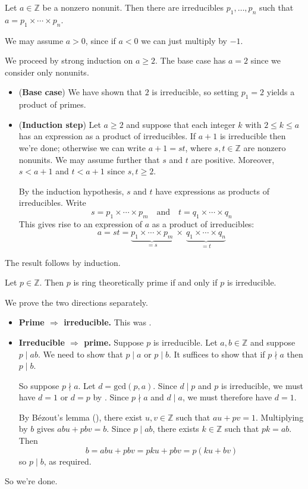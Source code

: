 \begin{lemma}
\label{lemFTAExists}
Let $a \in \mathbb{Z}$ be a nonzero nonunit. Then there are irreducibles $p_1, \dots, p_n$ such that $a = p_1 \times \cdots \times p_n$.
\end{lemma}
\begin{cproof}
We may assume $a>0$, since if $a<0$ we can just multiply by $-1$.

We proceed by strong induction on $a \ge 2$. The base case has $a=2$ since we consider only nonunits.
\begin{itemize}
\item (\textbf{Base case}) We have shown that $2$ is irreducible, so setting $p_1=2$ yields a product of primes.
\item (\textbf{Induction step}) Let $a \ge 2$ and suppose that each integer $k$ with $2 \le k \le a$ has an expression as a product of irreducibles. If $a+1$ is irreducible then we're done; otherwise we can write $a+1=st$, where $s,t \in \mathbb{Z}$ are nonzero nonunits. We may assume further that $s$ and $t$ are positive. Moreover, $s<a+1$ and $t<a+1$ since $s,t \ge 2$.

By the induction hypothesis, $s$ and $t$ have expressions as products of irreducibles. Write
\[ s = p_1 \times \cdots \times p_m \quad \text{and} \quad t = q_1 \times \cdots \times q_n \]
This gives rise to an expression of $a$ as a product of irreducibles:
\[ a = st = \underbrace{p_1 \times \cdots \times p_m}_{= s} ~\times~ \underbrace{q_1 \times \cdots \times q_n}_{= t} \]
\end{itemize}
The result follows by induction.
\end{cproof}

\begin{theorem}
\label{thmPrimeIffIrred}
Let $p \in \mathbb{Z}$. Then $p$ is ring theoretically prime if and only if $p$ is irreducible.
\end{theorem}
\begin{cproof}
We prove the two directions separately.
\begin{itemize}
\item \textbf{Prime $\Rightarrow$ irreducible.} This was .
\item \textbf{Irreducible $\Rightarrow$ prime.} Suppose $p$ is irreducible. Let $a,b \in \mathbb{Z}$ and suppose $p \mid ab$. We need to show that $p \mid a$ or $p \mid b$. It suffices to show that if $p \nmid a$ then $p \mid b$.

So suppose $p \nmid a$. Let $d = \mathrm{gcd}(p,a)$. Since $d \mid p$ and $p$ is irreducible, we must have $d=1$ or $d=p$ by . Since $p \nmid a$ and $d \mid a$, we must therefore have $d=1$.

By B\'{e}zout's lemma (), there exist $u,v \in \mathbb{Z}$ such that $au+pv=1$. Multiplying by $b$ gives $abu+pbv=b$. Since $p \mid ab$, there exists $k \in \mathbb{Z}$ such that $pk=ab$. Then
\[ b = abu+pbv = pku+pbv = p(ku+bv) \]
so $p \mid b$, as required.
\end{itemize}
So we're done.
\end{cproof}

